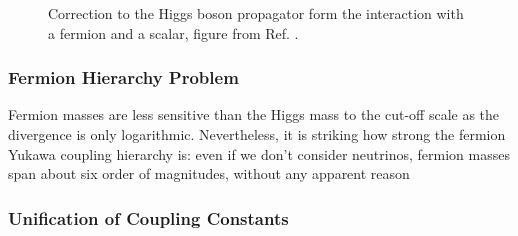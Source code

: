 \begin{figure}[ht]
\centering
{}
\caption{Correction to the Higgs boson propagator form the interaction with  a fermion and  a scalar, figure from Ref. \cite{Martin:1997ns}.}
\label{fig:sm:h_corr}
\end{figure}

\subsubsection*{Fermion Hierarchy Problem} 

Fermion masses are less sensitive than the Higgs mass to the cut-off scale as the divergence is only logarithmic. Nevertheless, it is striking how strong the fermion Yukawa coupling hierarchy is: even if we don't consider neutrinos, fermion masses span about six order of magnitudes, without any apparent reason

\subsubsection*{Unification of Coupling Constants}

